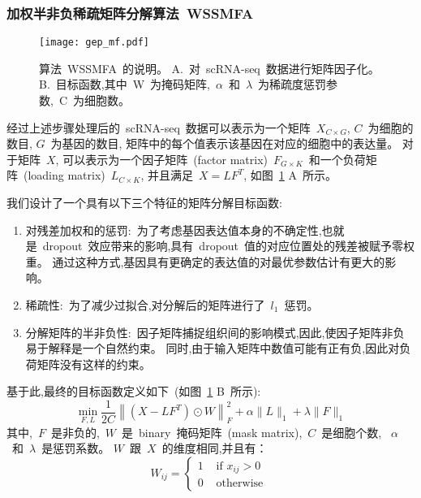 \subsubsection{加权半非负稀疏矩阵分解算法~WSSMFA}

\begin{figure}[!htbp]
    \centering
    \texttt{[image: gep\_mf.pdf]}
    \caption{
        算法~WSSMFA~的说明。
        A.~对~scRNA-seq~数据进行矩阵因子化。
        B.~目标函数,其中~W~为掩码矩阵,~$\alpha$~和~$\lambda$~为稀疏度惩罚参数,~C~为细胞数。
    }
    \label{fig:gep-mf}
\end{figure}

经过上述步骤处理后的~scRNA-seq~数据可以表示为一个矩阵~$X_{C \times G}$, $C$~为细胞的数目, $G$~为基因的数目, 
矩阵中的每个值表示该基因在对应的细胞中的表达量。
对于矩阵~$X$, 可以表示为一个因子矩阵~(factor matrix)~$F_{G \times K}$~和一个负荷矩阵~(loading matrix)~$L_{C \times K}$,
并且满足~$X=LF^T$, 如图~\ref{fig:gep-mf} A~所示。 

我们设计了一个具有以下三个特征的矩阵分解目标函数:
\begin{enumerate}
    \item 对残差加权和的惩罚:~为了考虑基因表达值本身的不确定性,也就是~dropout~效应带来的影响,具有~dropout~值的对应位置处的残差被赋予零权重。
          通过这种方式,基因具有更确定的表达值的对最优参数估计有更大的影响。
    \item 稀疏性:~为了减少过拟合,对分解后的矩阵进行了~$l_1$~惩罚。
    \item 分解矩阵的半非负性:~因子矩阵捕捉组织间的影响模式,因此,使因子矩阵非负易于解释是一个自然约束。
          同时,由于输入矩阵中数值可能有正有负,因此对负荷矩阵没有这样的约束。
\end{enumerate}
基于此,最终的目标函数定义如下~(如图~\ref{fig:gep-mf} B~所示):
\begin{equation}
    \label{eq:obj}
    \min _{F, L} \frac{1}{2 C}\left\|\left(X-L F^{T}\right) \odot W\right\|_{F}^{2}+\alpha\|L\|_{1}+\lambda\|F\|_{1}
\end{equation}
其中,~$F$~是非负的,~$W$~是~binary~掩码矩阵~(mask matrix),~$C$~是细胞个数,
~$\alpha$~和~$\lambda$~是惩罚系数。
$W$~跟~$X$~的维度相同,并且有：
\begin{equation}
    W_{i j}=\left\{\begin{array}{ll}1 & \text { if } x_{i j}>0 \\ 0 & \text { otherwise }\end{array}\right.
\end{equation}

